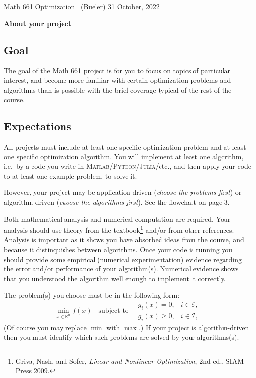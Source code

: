 \documentclass[12pt]{amsart}
\newcommand{\normalspacing}{\renewcommand{\baselinestretch}{1.05}
        \tiny\normalsize}
\newcommand{\RR}{\mathbb{R}}
\newcommand{\Matlab}{\textsc{Matlab}\xspace}
\newcommand{\Python}{\textsc{Python}\xspace}
\newcommand{\Julia}{\textsc{Julia}\xspace}
\begin{document}
\scriptsize \noindent Math 661 Optimization \, (Bueler) \hfill  31 October, 2022
\normalsize\bigskip
\normalspacing

\Large\centerline{\textbf{About your project}}
\normalsize

\bigskip\medskip
\thispagestyle{empty}
\normalspacing

\subsection*{Goal}  The goal of the Math 661 project is for you to focus on topics of particular interest, and become more familiar with certain optimization problems and algorithms than is possible with the brief coverage typical of the rest of the course.

\subsection*{Expectations}  All projects must include at least one specific optimization problem and at least one specific optimization algorithm.  You will implement at least one algorithm, i.e.~by a code you write in \Matlab/\Python/\Julia/etc., and then apply your code to at least one example problem, to solve it.

However, your project may be application-driven (\emph{choose the problems first}) or algorithm-driven (\emph{choose the algorithms first}).  See the flowchart on page 3.

Both mathematical analysis and numerical computation are required.  Your analysis should use theory from the textbook\footnote{Griva, Nash, and Sofer, \emph{Linear and Nonlinear Optimization}, 2nd ed., SIAM Press 2009.} and/or from other references.  Analysis is important as it shows you have absorbed ideas from the course, and because it distinquishes between algorithms.  Once your code is running you should provide some empirical (numerical experimentation) evidence regarding the error and/or performance of your algorithm(s).  Numerical evidence shows that you understood the algorithm well enough to implement it correctly.

The problem(s) you choose must be in the following form:
\begin{equation}
\min_{x\in \RR^n} f(x) \quad \text{subject to} \quad \begin{matrix}
                                                      g_i(x) = 0, & i \in \mathcal{E}, \\
                                                      g_i(x) \ge 0, & i \in \mathcal{I},
                                                      \end{matrix}  \label{genform}
\end{equation}
(Of course you may replace $\min$ with $\max$.)  If your project is algorithm-driven then you must identify which such problems are solved by your algorithms(s).
\end{document}
